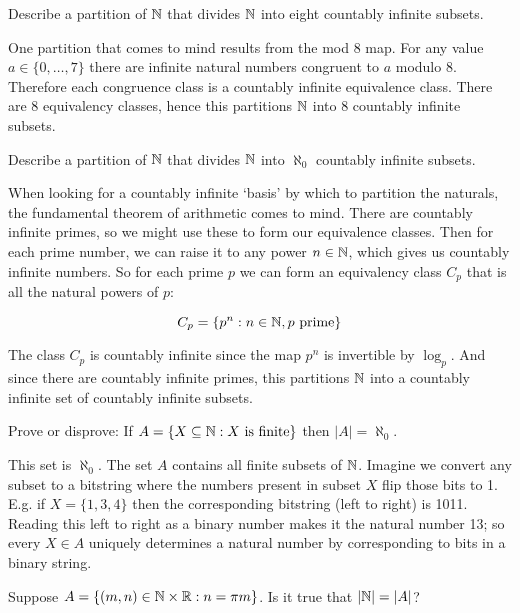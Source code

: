 \documentclass{article}
\begin{document}
\begin{problem}
Describe a partition of $\mathbb{N}$ that divides $\mathbb{N}$ into eight countably infinite subsets.
\end{problem}

One partition that comes to mind results from the mod 8 map. For any value $a \in \{0, \ldots, 7\}$ there are infinite natural numbers congruent to $a$ modulo 8. Therefore each congruence class is a countably infinite equivalence class. There are 8 equivalency classes, hence this partitions $\mathbb{N}$ into 8 countably infinite subsets.

\begin{problem}
Describe a partition of $\mathbb{N}$ that divides $\mathbb{N}$ into $\aleph_0$ countably infinite subsets.
\end{problem}

When looking for a countably infinite `basis' by which to partition the naturals, the fundamental theorem of arithmetic comes to mind. There are countably infinite primes, so we might use these to form our equivalence classes. Then for each prime number, we can raise it to any power $n \in \mathbb{N}$, which gives us countably infinite numbers. So for each prime $p$ we can form an equivalency class $C_p$ that is all the natural powers of $p$:

$$C_p = \{p^n: n \in \mathbb{N}, p \text{ prime}\}$$

The class $C_p$ is countably infinite since the map $p^n$ is invertible by $\log_p$. And since there are countably infinite primes, this partitions $\mathbb{N}$ into a countably infinite set of countably infinite subsets.

\begin{problem}
Prove or disprove: If $A = \{X \subseteq \mathbb{N}: X \text{ is finite}\}$ then $|A| = \aleph_0$.
\end{problem}

This set is $\aleph_0$. The set $A$ contains all finite subsets of $\mathbb{N}$. Imagine we convert any subset to a bitstring where the numbers present in subset $X$ flip those bits to 1. E.g. if $X = \{1, 3, 4\}$ then the corresponding bitstring (left to right) is 1011. Reading this left to right as a binary number makes it the natural number 13; so every $X \in A$ uniquely determines a natural number by corresponding to bits in a binary string.

\begin{problem}
Suppose $A = \{(m,n) \in \mathbb{N} \times \mathbb{R}: n = \pi m\}$. Is it true that $|\mathbb{N}| = |A|$?
\end{problem}
\end{document}
